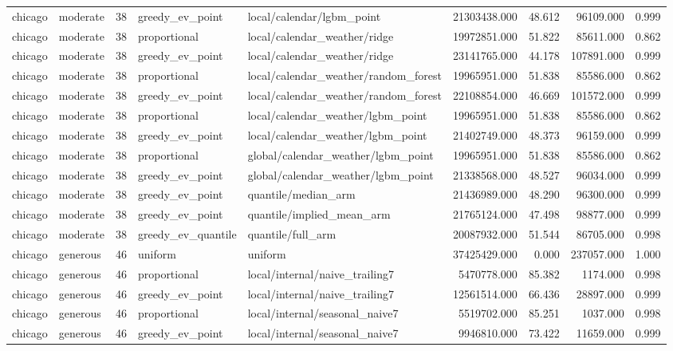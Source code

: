 \begin{tabular}{llrllrrrr}
chicago & moderate & 38 & greedy\_ev\_point & local/calendar/lgbm\_point & 21303438.000 & 48.612 & 96109.000 & 0.999 \\
chicago & moderate & 38 & proportional & local/calendar\_weather/ridge & 19972851.000 & 51.822 & 85611.000 & 0.862 \\
chicago & moderate & 38 & greedy\_ev\_point & local/calendar\_weather/ridge & 23141765.000 & 44.178 & 107891.000 & 0.999 \\
chicago & moderate & 38 & proportional & local/calendar\_weather/random\_forest & 19965951.000 & 51.838 & 85586.000 & 0.862 \\
chicago & moderate & 38 & greedy\_ev\_point & local/calendar\_weather/random\_forest & 22108854.000 & 46.669 & 101572.000 & 0.999 \\
chicago & moderate & 38 & proportional & local/calendar\_weather/lgbm\_point & 19965951.000 & 51.838 & 85586.000 & 0.862 \\
chicago & moderate & 38 & greedy\_ev\_point & local/calendar\_weather/lgbm\_point & 21402749.000 & 48.373 & 96159.000 & 0.999 \\
chicago & moderate & 38 & proportional & global/calendar\_weather/lgbm\_point & 19965951.000 & 51.838 & 85586.000 & 0.862 \\
chicago & moderate & 38 & greedy\_ev\_point & global/calendar\_weather/lgbm\_point & 21338568.000 & 48.527 & 96034.000 & 0.999 \\
chicago & moderate & 38 & greedy\_ev\_point & quantile/median\_arm & 21436989.000 & 48.290 & 96300.000 & 0.999 \\
chicago & moderate & 38 & greedy\_ev\_point & quantile/implied\_mean\_arm & 21765124.000 & 47.498 & 98877.000 & 0.999 \\
chicago & moderate & 38 & greedy\_ev\_quantile & quantile/full\_arm & 20087932.000 & 51.544 & 86705.000 & 0.998 \\
chicago & generous & 46 & uniform & uniform & 37425429.000 & 0.000 & 237057.000 & 1.000 \\
chicago & generous & 46 & proportional & local/internal/naive\_trailing7 & 5470778.000 & 85.382 & 1174.000 & 0.998 \\
chicago & generous & 46 & greedy\_ev\_point & local/internal/naive\_trailing7 & 12561514.000 & 66.436 & 28897.000 & 0.999 \\
chicago & generous & 46 & proportional & local/internal/seasonal\_naive7 & 5519702.000 & 85.251 & 1037.000 & 0.998 \\
chicago & generous & 46 & greedy\_ev\_point & local/internal/seasonal\_naive7 & 9946810.000 & 73.422 & 11659.000 & 0.999 \\

\end{tabular}
